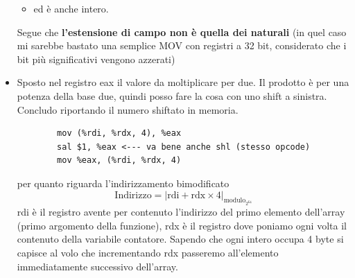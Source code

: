 \begin{itemize}
\begin{framed}
\begin{itemize}
			\item ed è anche intero.
		\end{itemize}
		Segue che \textbf{l'estensione di campo non è quella dei naturali} (in quel caso mi sarebbe bastato una semplice MOV con registri a 32 bit, considerato che i bit più significativi vengono azzerati)
	\end{framed}
	\item Sposto nel registro eax il valore da moltiplicare per due. Il prodotto è per una potenza della base due, quindi posso fare la cosa con uno shift a sinistra. Concludo riportando il numero shiftato in memoria.
	\begin{verbatim}
		mov (%rdi, %rdx, 4), %eax
		sal $1, %eax <--- va bene anche shl (stesso opcode)
		mov %eax, (%rdi, %rdx, 4)
	\end{verbatim}
	per quanto riguarda l'indirizzamento bimodificato
	\[\text{Indirizzo}=\left|\text{rdi}+\text{rdx}\times\text{4}\right|_{\text{modulo}_{2^{64}}}\]
	rdi è il registro avente per contenuto l'indirizzo del primo elemento dell'array (primo argomento della funzione), rdx è il registro dove poniamo ogni volta il contenuto della variabile contatore. Sapendo che ogni intero occupa 4 byte si capisce al volo che incrementando rdx passeremo all'elemento immediatamente successivo dell'array.
\end{itemize}
